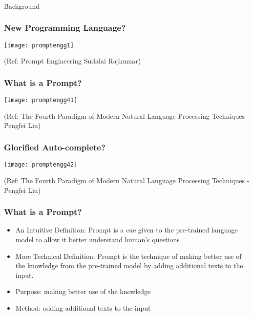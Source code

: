 \begin{frame}[fragile]\frametitle{}
\begin{center}
{\Large Background}
\end{center}
\end{frame}


\begin{frame}[fragile]\frametitle{New Programming Language?}

\begin{center}
\texttt{[image: promptengg1]}

{\tiny (Ref: Prompt Engineering Sudalai Rajkumar)}

\end{center}				

\end{frame}


\begin{frame}[fragile]\frametitle{What is a Prompt?}


\begin{center}
\texttt{[image: promptengg41]}

{\tiny (Ref: The Fourth Paradigm of Modern Natural Language Processing Techniques - Pengfei Liu)}

\end{center}		

\end{frame}

\begin{frame}[fragile]\frametitle{Glorified Auto-complete?}


\begin{center}
\texttt{[image: promptengg42]}

{\tiny (Ref: The Fourth Paradigm of Modern Natural Language Processing Techniques - Pengfei Liu)}

\end{center}		

\end{frame}

\begin{frame}[fragile]\frametitle{What is a Prompt?}

\begin{itemize}
\item An Intuitive Definition: Prompt is a cue given to the pre-trained language model to allow it
better understand human’s questions
\item More Technical Definition: Prompt is the technique of making better use of the knowledge from
the pre-trained model by adding additional texts to the input.
\item Purpose: making better use of the knowledge
\item Method: adding additional texts to the input
\end{itemize}
\end{frame}

